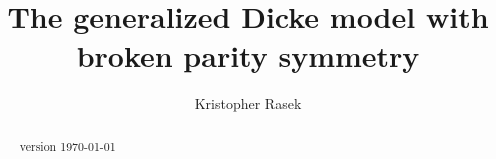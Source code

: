 \documentclass[a4paper,11pt,twosided]{article}
\title{The generalized Dicke model with broken parity symmetry}
\author{Kristopher Rasek}
\begin{document}
\maketitle
\begin{abstract}
 version \today ~  \currenttime
\end{abstract}
\newpage
\tableofcontents


%
%
% 
%
%

%
%
% 
%


\nocite{*} 
%
\end{document}
